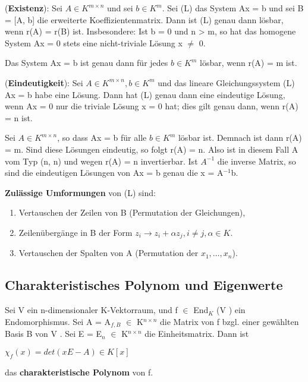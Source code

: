 \begin{proposition}
(\textbf{Existenz}): Sei $A \in K^{m \times n}$ und sei $b \in K^m$. Sei (L) das System Ax = b und sei B = [A, b] die erweiterte Koeffizientenmatrix. Dann ist (L) genau dann lösbar, wenn r(A) = r(B) ist. Insbesondere: Ist b = 0 und n > m, so hat das homogene System Ax = 0 stets eine nicht-triviale Lösung x $\neq$ 0.
\end{proposition}

\begin{remark}
Das System Ax = b ist genau dann für jedes $b \in K^m$ lösbar, wenn r(A) = m ist.
\end{remark}

\begin{proposition}
(\textbf{Eindeutigkeit}): Sei $A \in K^{m \times n},b \in K^m$ und das lineare Gleichungssystem (L) Ax = b habe eine Lösung. Dann hat (L) genau dann eine eindeutige Lösung, wenn Ax = 0 nur die triviale Lösung x = 0 hat; dies gilt genau dann, wenn r(A) = n ist.
\end{proposition}

\begin{remark}
Sei $A \in K^{m \times n}$, so dass Ax = b für alle $b \in K^m$ lösbar ist. Demnach ist dann r(A) = m. Sind diese Lösungen eindeutig, so folgt r(A) = n. Also ist in diesem Fall A vom Typ (n, n) und wegen r(A) = n invertierbar. Ist $A^{-1}$ die inverse Matrix, so sind die eindeutigen Lösungen von Ax = b genau die x = A$^{-1}$b.
\end{remark}

\textbf{Zulässige Umformungen} von (L) sind:
\begin{enumerate}
\item Vertauschen der Zeilen von B (Permutation der Gleichungen),
\item Zeilenübergänge in B der Form $z_i \to z_i+\alpha z_j, i \neq j,\alpha \in K$.
\item Vertauschen der Spalten von A (Permutation der $x_1, …, x_n$).
\end{enumerate}


\subsection{Charakteristisches Polynom und Eigenwerte}
\begin{definition}
Sei V ein n-dimensionaler K-Vektorraum, und f $\in$ End$_K$ (V ) ein Endomorphismus. Sei A = A$_{f,B}$ $\in$ K$^{n \times n}$ die Matrix von f bzgl. einer gewählten Basis B von V . Sei E = E$_n$ $\in$ K$^{n \times n}$ die Einheitsmatrix. Dann ist
\begin{center}
$\chi_f (x) = det(xE - A) \in K[x]$
\end{center}
das \textbf{charakteristische Polynom} von f.
\end{definition}

